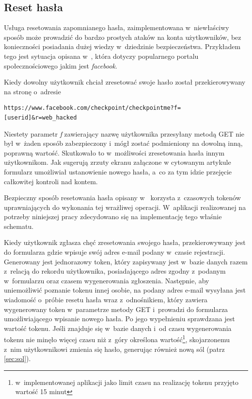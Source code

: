 \documentclass[11pt]{aghdpl}
\begin{document}

\subsection{Reset hasła}
\label{sec:resetHaslaBezp}

Usługa resetowania zapomnianego hasła, zaimplementowana w~niewłaściwy sposób może prowadzić do bardzo prostych ataków na konta użytkowników, bez konieczności posiadania dużej wiedzy w~dziedzinie bezpieczeństwa. Przykładem tego jest sytuacja opisana w~\cite{FbB}, która dotyczy popularnego portalu społecznościowego jakim jest \emph{facebook}.

Kiedy dowolny użytkownik chciał zresetować swoje hasło został przekierowywany na stronę o~adresie
\begin{lstlisting}
https://www.facebook.com/checkpoint/checkpointme?f=[userid]&r=web_hacked
\end{lstlisting}

Niestety parametr \emph{f} zawierający nazwę użytkownika przesyłany metodą GET nie był w~żaden sposób zabezpieczony i~mógł zostać podmieniony na dowolną inną, poprawną wartość. Skutkowało to w~możliwości zresetowania hasła innym użytkownikom. Jak sugerują zrzuty ekranu załączone w cytowanym artykule formularz umożliwiał ustanowienie nowego hasła, a~co za tym idzie przejęcie całkowitej kontroli nad kontem.

Bezpieczny sposób resetowania hasła opisany w~\cite{CSH} korzysta z~czasowych tokenów uprawniających do wykonania tej wrażliwej operacji. W~aplikacji realizowanej na potrzeby niniejszej pracy zdecydowano się na implementację tego właśnie schematu.

Kiedy użytkownik zgłasza chęć zresetowania swojego hasła, przekierowywany jest do formularza gdzie wpisuje swój adres e-mail podany w~czasie rejestracji. Generowany jest jednorazowy token, który zapisywany jest w~bazie danych razem z~relacją do rekordu użytkownika, posiadającego adres zgodny z~podanym w~formularzu oraz czasem wygenerowania zgłoszenia. Następnie, aby uniemożliwić poznanie tokenu innej osobie, na podany adres e-mail wysyłana jest wiadomość o~próbie resetu hasła wraz z~odnośnikiem, który zawiera wygenerowany token w~parametrze metody GET i~prowadzi do formularza umożliwiającego wpisanie nowego hasła. Po jego wypełnieniu sprawdzana jest wartość tokenu. Jeśli znajduje się w~bazie danych i~od czasu wygenerowania tokenu nie minęło więcej czasu niż z~góry określona wartość\footnote{w~implementowanej aplikacji jako limit czasu na realizację tokenu przyjęto wartość 15 minut}, skojarzonemu z~nim użytkownikowi zmienia się hasło, generując również nową sól (patrz \ref{sec:sol}).
\end{document}
